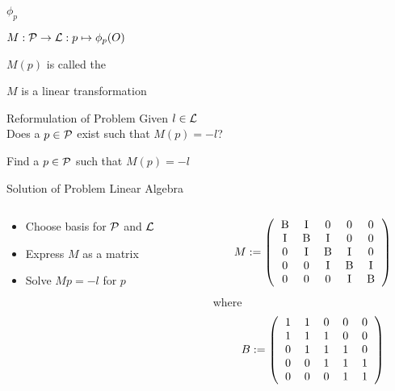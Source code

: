 \begin{frame}{$\phi_{p}$}
	\begin{definition}
		$M : \mathcal{P} \rightarrow \mathcal{L} : p \mapsto \phi_{p}(O)$
	\end{definition}
	\bigskip
	$M(p)$ is called the 
	
	\pause
	\bigskip	
	\begin{theorem}
		$M$ is a linear transformation
	\end{theorem}
\end{frame}

\begin{frame}{Reformulation of Problem}
	Given $l \in \mathcal{L}$\\
	Does a $p \in \mathcal{P}$ exist such that $M(p) = -l$?
	
	\pause
	\bigskip
	Find a $p \in \mathcal{P}$ such that $M(p) = -l$	
\end{frame}

\begin{frame}{Solution of Problem}
	Linear Algebra
	\begin{columns}[t]
		\begin{column}{0.45\textwidth}
			\begin{itemize}
				\item Choose basis for $\mathcal{P}$ and $\mathcal{L}$
				\item Express $M$ as a matrix
				\item Solve $M p = -l$ for $p$
			\end{itemize}

		\end{column}
		\begin{column}{0.45\textwidth}
			\[
				M := \left(
				\begin{tabular}{ccccc}
					B & I & 0 & 0 & 0 \\
					I & B & I & 0 & 0 \\
					0 & I & B & I & 0 \\
					0 & 0 & I & B & I \\
					0 & 0 & 0 & I & B \\
				\end{tabular}
				\right)
			\]
			where
			\[
				B := \left(
				\begin{tabular}{ccccc}
					1 & 1 & 0 & 0 & 0 \\
					1 & 1 & 1 & 0 & 0 \\
					0 & 1 & 1 & 1 & 0 \\
					0 & 0 & 1 & 1 & 1 \\
					0 & 0 & 0 & 1 & 1 \\
				\end{tabular}
				\right)
			\]
		\end{column}
	\end{columns}
\end{frame}

